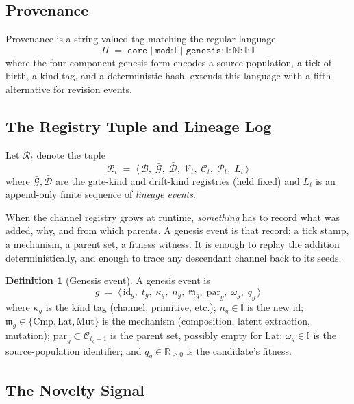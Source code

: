\documentclass[journal,onecolumn,11pt]{IEEEtran}
\theoremstyle{definition}
\newtheorem{definition}{Definition}
\begin{document}
\subsection{Provenance}

Provenance is a string-valued tag matching the regular language
\[
\Pi \;=\; \mathtt{core} \;\big|\; \mathtt{mod}\!:\!\mathbb{I} \;\big|\; \mathtt{genesis}\!:\!\mathbb{I}\!:\!\mathbb{N}\!:\!\mathbb{I}\!:\!\mathbb{I}
\]
where the four-component genesis form encodes a source population, a tick of birth, a kind tag, and a deterministic hash.  extends this language with a fifth alternative for revision events.

\subsection{The Registry Tuple and Lineage Log}

Let $\mathcal{R}_t$ denote the tuple
\[
\mathcal{R}_t \;=\; \langle\, \mathcal{B},\; \bar{\mathcal{G}},\; \bar{\mathcal{D}},\; \mathcal{V}_t,\; \mathcal{C}_t,\; \mathcal{P}_t,\; L_t \,\rangle
\]
where $\bar{\mathcal{G}}, \bar{\mathcal{D}}$ are the gate-kind and drift-kind registries (held fixed) and $L_t$ is an append-only finite sequence of \emph{lineage events}.

When the channel registry grows at runtime, \emph{something} has to record what was added, why, and from which parents. A genesis event is that record: a tick stamp, a mechanism, a parent set, a fitness witness. It is enough to replay the addition deterministically, and enough to trace any descendant channel back to its seeds.

\begin{definition}[Genesis event]
A genesis event is
\[
g \;=\; \langle\, \mathrm{id}_g,\; t_g,\; \kappa_g,\; n_g,\; \mathfrak{m}_g,\; \mathrm{par}_g,\; \omega_g,\; q_g \,\rangle
\]
where $\kappa_g$ is the kind tag (channel, primitive, etc.); $n_g \in \mathbb{I}$ is the new id; $\mathfrak{m}_g \in \{\mathrm{Cmp},\mathrm{Lat},\mathrm{Mut}\}$ is the mechanism (composition, latent extraction, mutation); $\mathrm{par}_g \subset \mathcal{C}_{t_g - 1}$ is the parent set, possibly empty for $\mathrm{Lat}$; $\omega_g \in \mathbb{I}$ is the source-population identifier; and $q_g \in \mathbb{R}_{\ge 0}$ is the candidate's fitness.
\end{definition}

\subsection{The Novelty Signal}
\end{document}
